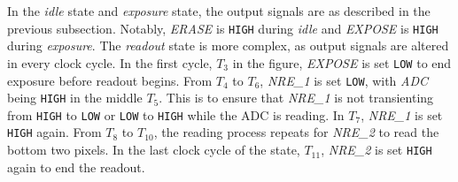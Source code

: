 In the \emph{idle} state and \emph{exposure} state, the output signals are as described in the previous subsection. Notably, \emph{ERASE} is \verb|HIGH| during \emph{idle} and \emph{EXPOSE} is \verb|HIGH| during \emph{exposure}. The \emph{readout} state is more complex, as output signals are altered in every clock cycle. In the first cycle, $T_3$ in the figure, \emph{EXPOSE} is set \verb|LOW| to end exposure before readout begins. From $T_4$ to $T_6$, \emph{NRE\_1} is set \verb|LOW|, with \emph{ADC} being \verb|HIGH| in the middle $T_5$. This is to ensure that \emph{NRE\_1} is not transienting from \verb|HIGH| to \verb|LOW| or \verb|LOW| to \verb|HIGH| while the ADC is reading. In $T_7$, \emph{NRE\_1} is set \verb|HIGH| again. From $T_8$ to $T_{10}$, the reading process repeats for \emph{NRE\_2} to read the bottom two pixels. In the last clock cycle of the state, $T_{11}$, \emph{NRE\_2} is set \verb|HIGH| again to end the readout.
